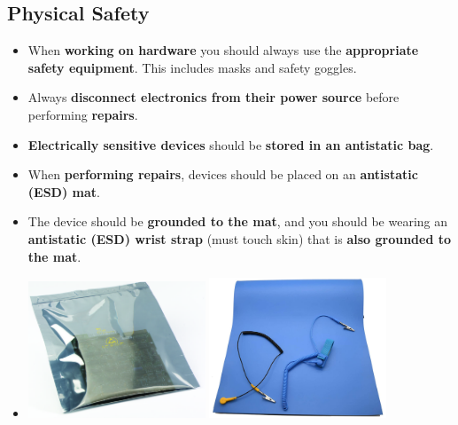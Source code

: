 \documentclass{article}
\begin{document}
    \subsection*{Physical Safety}
    \begin{itemize}
        \item When \textbf{working on hardware} you should always use the \textbf{appropriate safety equipment}. This includes masks and safety goggles.
        \item Always \textbf{disconnect electronics from their power source} before performing \textbf{repairs}.
        \item \textbf{Electrically sensitive devices} should be \textbf{stored in an antistatic bag}.
        \item When \textbf{performing repairs}, devices should be placed on an \textbf{antistatic (ESD) mat}.
        \item The device should be \textbf{grounded to the mat}, and you should be wearing an \textbf{antistatic (ESD) wrist strap} (must touch skin) that is \textbf{also grounded to the mat}.
        \item[] \begin{center}
                    \includegraphics[width=200px]{images/Antistatic-Bag.jpg}
                    \includegraphics[width=200px]{images/ESD-Mat.jpg}
                \end{center}
    \end{itemize}
\end{document}
